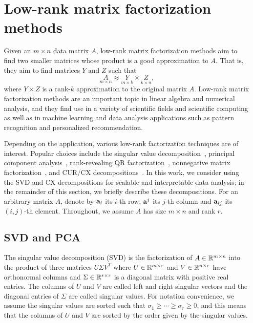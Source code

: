 \section{Low-rank matrix factorization methods}
\label{sxn:low-rank-methods}

Given an $m \times n$ data matrix $A$, low-rank matrix factorization methods aim to find two smaller matrices whose product is a good approximation to $A$.
That is, they aim to find matrices $Y$ and $Z$ such that
\begin{equation}
 \label{eqn:apprx}
    \underset{m\times n}{A} \approx \underset{m\times k}{Y} \times \underset{k\times n}{Z} , 
\end{equation}
where $Y \times Z$ is a rank-$k$ approximation to the original matrix $A$.
Low-rank matrix factorization methods are an important topic in linear algebra and numerical analysis, and they find use in a variety of scientific fields and scientific computing as well as in machine learning and data analysis applications such as pattern recognition and personalized recommendation.

Depending on the application, various low-rank factorization techniques are of interest. 
Popular choices include the singular value decomposition~\cite{GVL96}, principal component analysis~\cite{pcaBook}, rank-revealing QR factorization~\cite{GE96}, nonnegative matrix factorization~\cite{NMFalg}, and CUR/CX decompositions~\cite{CUR_PNAS}.
In this work, we consider using the SVD and CX decompositions for scalable and interpretable data analysis; in the remainder of this section, we briefly describe these decompositions.
For an arbitrary matrix $A$, denote by $\mathbf{a}_i$ its $i$-th row, $\mathbf{a}^j$ its $j$-th column and $\mathbf{a}_{ij}$ its $(i,j)$-th element. 
Throughout, we assume $A$ has size $m \times n$ and rank $r$.


\subsection{SVD and PCA}

The singular value decomposition (SVD) is the factorization of $A \in \mathbb{R}^{m\times n}$ into the product of three matrices $U\Sigma V^T$ where $U \in \mathbb{R}^{m\times r}$ and $V\in \mathbb{R}^{n\times r}$ have orthonormal columns and $\Sigma\in \mathbb{R}^{r\times r}$ is a diagonal matrix with positive real entries. 
The columns of $U$ and $V$ are called left and right singular vectors and the diagonal entries of $\Sigma$ are called singular values. 
For notation convenience, we assume the singular values are sorted such that $\sigma_1\geq \cdots \geq \sigma_r\geq 0$, and this means that the columns of $U$ and $V$ are sorted by the order given by the singular values.  

